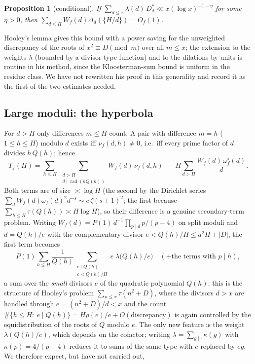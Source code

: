 \documentclass[11pt,a4paper]{article}
\newtheorem{proposition}[theorem]{Proposition}
\begin{document}
\begin{proposition}[conditional]\label{prop:A2}
If $\sum_{d\le x}\lambda(d)\,D^\ast_d\ll x(\log x)^{-1-\eta}$ for some $\eta>0$, then
$\sum_{d\le H}W_f(d)\Delta_d(\{H/d\})=O_f(1)$.
\end{proposition}

Hooley's lemma gives this bound with a power saving for the unweighted discrepancy of the roots of
$x^2\equiv D\pmod m$ over all $m\le x$; the extension to the weights $\lambda$ (bounded by a divisor-type
function) and to the dilations by units is routine in his method, since the Kloosterman-sum bound is
uniform in the residue class. We have not rewritten his proof in this generality and record it as the
first of the two estimates needed.

\subsection{Large moduli: the hyperbola}

For $d>H$ only differences $m\le H$ count. A pair with difference $m=h$ ($1\le h\le H$) modulo $d$ exists
iff $\nu_f(d,h)\ne0$, i.e.\ iff every prime factor of $d$ divides $h\,Q(h)$; hence
\[
T_f(H)=\sum_{h\le H}\ \sum_{\substack{d>H\\ d\mid\operatorname{rad}(hQ(h))}}W_f(d)\,\nu_f(d,h)\;-\;H\sum_{d>H}\frac{W_f(d)\,\omega^\circ_f(d)}d .
\]
Both terms are of size $\asymp\log H$ (the second by the Dirichlet series
$\sum_dW_f(d)\omega_f(d)^2d^{-s}\sim c\,\zeta(s+1)^2$; the first because $\sum_{h\le H}\tau(Q(h))\asymp H\log H$),
so their difference is a genuine secondary-term problem. Writing $W_f(d)=P(1)\,d^{-1}\prod_{p\mid d}p/(p-4)$
on split moduli and $d=Q(h)/e$ with the complementary divisor $e<Q(h)/H\le a^2H+|D|$, the first term
becomes
\[
P(1)\sum_{h\le H}\frac1{Q(h)}\sum_{\substack{e\mid Q(h)\\ e<Q(h)/H}}e\;\lambda\bigl(Q(h)/e\bigr)\quad(+\text{the terms with }p\mid h),
\]
a sum over the \emph{small} divisors $e$ of the quadratic polynomial $Q(h)$: this is the structure of
Hooley's problem $\sum_{n\le x}\tau(n^2+D)$, where the divisors $d>x$ are handled through $e=(n^2+D)/d<x$
and the count $\#\{h\le H:\ e\mid Q(h)\}=H\rho(e)/e+O(\text{discrepancy})$ is again controlled by the
equidistribution of the roots of $Q$ modulo $e$. The only new feature is the weight $\lambda(Q(h)/e)$,
which depends on the cofactor; writing $\lambda=\sum_{g\mid\cdot}\kappa(g)$ with $\kappa(p)=4/(p-4)$
reduces it to sums of the same type with $e$ replaced by $eg$. We therefore expect, but have not carried
out,
\end{document}
